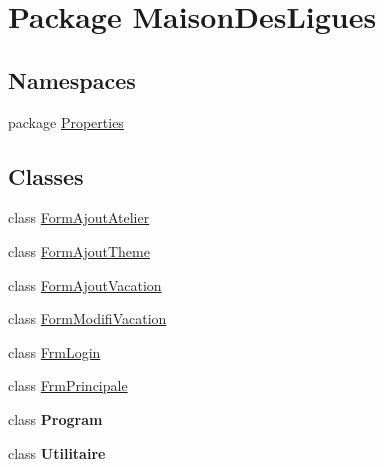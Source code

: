 \hypertarget{namespace_maison_des_ligues}{\section{Package Maison\+Des\+Ligues}
\label{namespace_maison_des_ligues}
}
\subsection*{Namespaces}
\begin{DoxyCompactItemize}
\item 
package \hyperlink{namespace_maison_des_ligues_1_1_properties}{Properties}
\end{DoxyCompactItemize}
\subsection*{Classes}
\begin{DoxyCompactItemize}
\item 
class \hyperlink{class_maison_des_ligues_1_1_form_ajout_atelier}{Form\+Ajout\+Atelier}
\item 
class \hyperlink{class_maison_des_ligues_1_1_form_ajout_theme}{Form\+Ajout\+Theme}
\item 
class \hyperlink{class_maison_des_ligues_1_1_form_ajout_vacation}{Form\+Ajout\+Vacation}
\item 
class \hyperlink{class_maison_des_ligues_1_1_form_modifi_vacation}{Form\+Modifi\+Vacation}
\item 
class \hyperlink{class_maison_des_ligues_1_1_frm_login}{Frm\+Login}
\item 
class \hyperlink{class_maison_des_ligues_1_1_frm_principale}{Frm\+Principale}
\item 
class {\bfseries Program}
\item 
class {\bfseries Utilitaire}
\end{DoxyCompactItemize}
